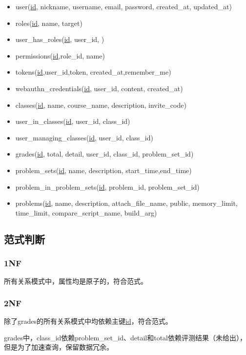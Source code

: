 \documentclass{ctexrep}
\begin{document}
\begin{itemize}
\item
  user(\underline{id}, nickname, username, email, password, created_at, updated_at)
\item
  roles(\underline{id}, name, target)
\item
  user_has_roles(\underline{id}, user_id, )
\item
  permissions(\underline{id},role_id, name)
\item
  tokens(\underline{id},user_id,token, created_at,remember_me)
\item
  webauthn_credentials(\underline{id}, user_id, content, created_at)
\item
  classes(\underline{id}, name, course_name, description, invite_code)
\item
  user_in_classes(\underline{id}, user_id, class_id)
\item
  user_managing_classes(\underline{id}, user_id, class_id)
\item
  grades(\underline{id}, total, detail, user_id, class_id,
  problem_set_id)
\item
  problem_sets(\underline{id}, name, description,
  start_time,end_time)
\item
  problem_in_problem_sets(\underline{id}, problem_id,
  problem_set_id)
\item
  problems(\underline{id}, name, description, attach_file_name,
  public, memory_limit, time_limit, compare_script_name, build_arg)
\end{itemize}


\subsection{范式判断}


\subsubsection{1NF}

所有关系模式中，属性均是原子的，符合范式。

\subsubsection{2NF}

除了grades的所有关系模式中均依赖主键\underline{id}，符合范式。

grades中，class_id依赖problem_set_id、detail和total依赖评测结果（未给出），但是为了加速查询，保留数据冗余。
\end{document}
